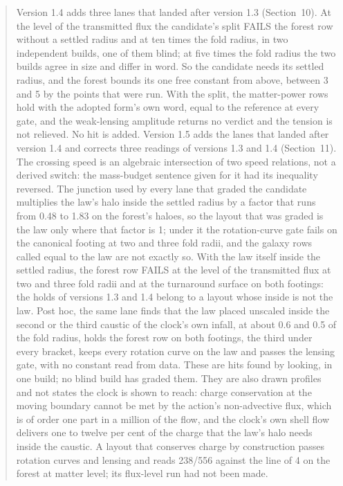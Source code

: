 \documentclass[10pt]{article}
\begin{document}
\begin{abstract}
Version 1.4 adds three lanes that landed after version 1.3 (Section~10). At the level of the transmitted flux the candidate's split FAILS the forest row without a settled radius and at ten times the fold radius, in two independent builds, one of them blind; at five times the fold radius the two builds agree in size and differ in word. So the candidate needs its settled radius, and the forest bounds its one free constant from above, between 3 and 5 by the points that were run. With the split, the matter-power rows hold with the adopted form's own word, equal to the reference at every gate, and the weak-lensing amplitude returns no verdict and the tension is not relieved. No hit is added.
Version 1.5 adds the lanes that landed after version 1.4 and corrects three readings of versions 1.3 and 1.4 (Section~11). The crossing speed is an algebraic intersection of two speed relations, not a derived switch: the mass-budget sentence given for it had its inequality reversed. The junction used by every lane that graded the candidate multiplies the law's halo inside the settled radius by a factor that runs from 0.48 to 1.83 on the forest's haloes, so the layout that was graded is the law only where that factor is 1; under it the rotation-curve gate fails on the canonical footing at two and three fold radii, and the galaxy rows called equal to the law are not exactly so. With the law itself inside the settled radius, the forest row FAILS at the level of the transmitted flux at two and three fold radii and at the turnaround surface on both footings: the holds of versions 1.3 and 1.4 belong to a layout whose inside is not the law. Post hoc, the same lane finds that the law placed unscaled inside the second or the third caustic of the clock's own infall, at about 0.6 and 0.5 of the fold radius, holds the forest row on both footings, the third under every bracket, keeps every rotation curve on the law and passes the lensing gate, with no constant read from data. These are hits found by looking, in one build; no blind build has graded them. They are also drawn profiles and not states the clock is shown to reach: charge conservation at the moving boundary cannot be met by the action's non-advective flux, which is of order one part in a million of the flow, and the clock's own shell flow delivers one to twelve per cent of the charge that the law's halo needs inside the caustic. A layout that conserves charge by construction passes rotation curves and lensing and reads 238/556 against the line of 4 on the forest at matter level; its flux-level run had not been made.

\end{abstract}
\end{document}
